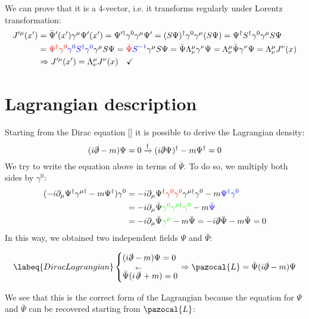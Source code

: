 \documentclass[../main.tex]{subfiles}
\begin{document}
We can prove that it is a 4-vector, i.e. it transforms regularly under Lorentz transformation:
\begin{align*}
J'^\mu(x')&=\bar{\Psi}'(x')\gamma^\mu\Psi'(x')=\Psi'^\dagger\gamma^0\gamma^\mu\Psi'=(S\Psi)^\dagger\gamma^0\gamma^\mu(S\Psi)=\Psi^\dagger S^\dagger\gamma^0\gamma^\mu S\Psi\\
&={\color{red}\Psi^\dagger\gamma^0}{\color{blue}\gamma^0 S^\dagger\gamma^0}\gamma^\mu S\Psi={\color{red}\Bar{\Psi}}{\color{blue}S^{-1}}\gamma^\mu S\Psi=\bar{\Psi}\Lambda^\mu_\nu\gamma^\nu\Psi=\Lambda^\mu_\nu\bar{\Psi}\gamma^\nu\Psi=\Lambda^\mu_\nu J^\nu(x)\\
&\Rightarrow J'^\mu(x')=\Lambda^\mu_\nu J^\nu(x) \quad \checkmark
\end{align*}
\section{Lagrangian description}
Starting from the Dirac equation [] it is possible to derive the Lagrangian density:
\[
(i\slashed{\partial}-m)\Psi=0\xrightarrow[]{\dagger}(i\slashed{\partial}\Psi)^\dagger-m\Psi^\dagger=0
\]
We try to write the equation above in terms of $\bar{\Psi}$. To do so, we multiply both sides by $\gamma^0$:
\begin{align*}
(-i\partial_\mu\Psi^\dagger\gamma^{\mu\dagger}-m\Psi^\dagger)\gamma^0&=-i\partial_\mu\Psi^\dagger{\color{red}\gamma^0\gamma^0}\gamma^{\mu\dagger}\gamma^0-m{\color{blue}\Psi^\dagger\gamma^0}\\
&=-i\partial_\mu\bar{\Psi}{\color{green}\gamma^0\gamma^{\mu\dagger}\gamma^0}-m{\color{blue}\bar{\Psi}}\\
&=-i\partial_\mu\bar{\Psi}{\color{green}\gamma^\mu}-m\bar{\Psi}=-i\slashed{\partial}\bar{\Psi}-m\bar{\Psi}=0
\end{align*}
In this way, we obtained two independent fields $\Psi$ and $\bar{\Psi}$:
\begin{kaobox}[frametitle=Lagrangian density]
\begin{equation}
\labeq{DiracLagrangian}
\left\{
\begin{aligned}
&(i\slashed{\partial}-m)\Psi=0\\
&\bar{\Psi}(i\overset{\leftarrow}{\slashed{\partial}}+m)=0
\end{aligned}
\right.
\Rightarrow
\pazocal{L}=\bar{\Psi}(i\slashed{\partial}-m)\Psi
\end{equation}
\end{kaobox}
We see that this is the correct form of the Lagrangian because the equation for $\Psi$ and $\bar{\Psi}$ can be recovered starting from $\pazocal{L}$:
\end{document}
